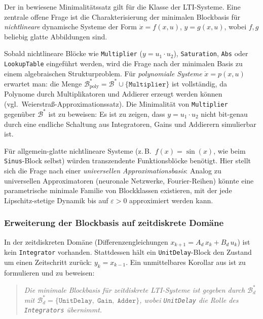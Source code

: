 ﻿\documentclass[12pt,a4paper]{article}
\theoremstyle{definition}
\begin{document}
Der in  bewiesene Minimalitätssatz gilt für die Klasse der
LTI-Systeme. Eine zentrale offene Frage ist die Charakterisierung der
minimalen Blockbasis für \emph{nichtlineare} dynamische Systeme der Form
$\dot{x} = f(x, u)$, $y = g(x, u)$, wobei $f, g$ beliebig glatte
Abbildungen sind.

Sobald nichtlineare Blöcke wie \texttt{Multiplier} ($y = u_1 \cdot u_2$),
\texttt{Saturation}, \texttt{Abs} oder \texttt{LookupTable} eingeführt
werden, wird die Frage nach der minimalen Basis zu einem algebraischen
Strukturproblem. Für \emph{polynomiale Systeme} $\dot{x} = p(x, u)$
erwartet man: die Menge
$\mathcal{B}^*_{\mathrm{poly}} = \mathcal{B}^* \cup \{\texttt{Multiplier}\}$
ist vollständig, da Polynome durch Multiplikatoren und Addierer erzeugt
werden können (vgl.\ Weierstraß-Approximationssatz). Die Minimalität von
\texttt{Multiplier} gegenüber $\mathcal{B}^*$ ist zu beweisen: Es ist zu
zeigen, dass $y = u_1 \cdot u_2$ nicht bit-genau durch eine endliche
Schaltung aus Integratoren, Gains und Addierern simulierbar ist.

Für allgemein-glatte nichtlineare Systeme (z.\,B.\ $f(x) = \sin(x)$, wie
beim \texttt{Sinus}-Block selbst) würden transzendente Funktionsblöcke
benötigt. Hier stellt sich die Frage nach einer
\emph{universellen Approximationsbasis}: Analog zu universellen
Approximatoren (neuronale Netzwerke, Fourier-Reihen) könnte eine
parametrische minimale Familie von Blockklassen existieren, mit der jede
Lipschitz-stetige Dynamik bis auf $\varepsilon > 0$ approximiert werden kann.

\subsubsection{Erweiterung der Blockbasis auf zeitdiskrete Domäne}

In der zeitdiskreten Domäne (Differenzengleichungen
$x_{k+1} = A_d\,x_k + B_d\,u_k$) ist kein \texttt{Integrator} vorhanden.
Stattdessen hält ein \texttt{UnitDelay}-Block den Zustand um einen
Zeitschritt zurück: $y_k = x_{k-1}$. Ein unmittelbares Korollar aus
 ist zu formulieren und zu beweisen:

\begin{quote}
\textit{Die minimale Blockbasis für zeitdiskrete LTI-Systeme ist gegeben durch $\mathcal{B}^*_d$ mit $\mathcal{B}^*_d = \{\texttt{UnitDelay},\;\texttt{Gain},\;\texttt{Adder}\}$,
wobei \texttt{UnitDelay} die Rolle des \texttt{Integrators} übernimmt.}
\end{quote}
\end{document}
